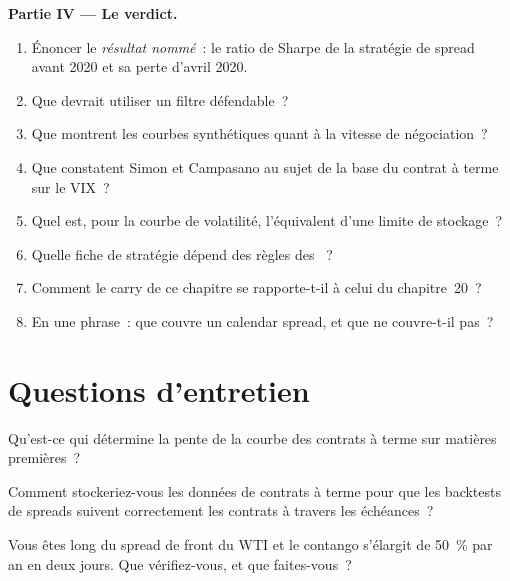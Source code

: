\begin{problem}
\medskip\noindent\textbf{Partie IV --- Le verdict.}
\begin{enumerate}[resume]
\item Énoncer le \emph{résultat nommé}~: le ratio de Sharpe de la stratégie de spread avant 2020 et sa perte d'avril 2020.
\item Que devrait utiliser un filtre défendable~?
\item Que montrent les courbes synthétiques quant à la vitesse de négociation~?
\item Que constatent Simon et Campasano au sujet de la base du contrat à terme sur le VIX~?
\item Quel est, pour la courbe de volatilité, l'équivalent d'une limite de stockage~?
\item Quelle fiche de stratégie dépend des règles des ~?
\item Comment le carry de ce chapitre se rapporte-t-il à celui du chapitre~20~?
\item En une phrase~: que couvre un calendar spread, et que ne couvre-t-il pas~?
\end{enumerate}
\end{problem}

\section{Questions d'entretien}

\begin{interviewq}\label{iq:s1:calendar-spreads-and-curve-trades:1}
Qu'est-ce qui détermine la pente de la courbe des contrats à terme sur matières premières~?
\end{interviewq}

\begin{interviewq}\label{iq:s1:calendar-spreads-and-curve-trades:2}
Comment stockeriez-vous les données de contrats à terme pour que les backtests de spreads suivent correctement les contrats à travers les échéances~?
\end{interviewq}

\begin{interviewq}\label{iq:s1:calendar-spreads-and-curve-trades:3}
Vous êtes long du spread de front du WTI et le contango s'élargit de 50~\% par an en deux jours. Que vérifiez-vous, et que faites-vous~?
\end{interviewq}


